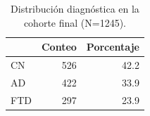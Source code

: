 \begin{table}[H]
\centering
\begin{tabular}{lrr}
\toprule
 & Conteo & Porcentaje \\
\midrule
CN & 526 & 42.2 \\
AD & 422 & 33.9 \\
FTD & 297 & 23.9 \\
\bottomrule
\end{tabular}
\caption{Distribución diagnóstica en la cohorte final (N=1245).}
\label{tab:diag_dist}
\end{table}
